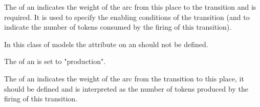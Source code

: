 The  of an \Input indicates the weight of the arc from this place to the transition and is required. It is used to specify the enabling conditions of the transition (and to indicate the number of tokens consumed by the firing of this transition). 

In this class of models the  attribute on an \Input should not be defined.

The  of an  is set to "production". 

The  of an \Output indicates the weight of the arc from the transition to this place, it should be defined and is interpreted as  the number of tokens produced by the firing of this transition.








